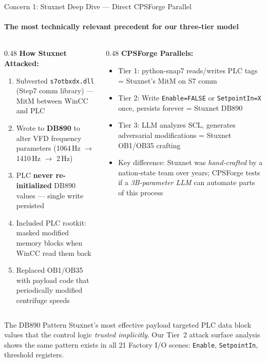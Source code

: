 \documentclass[aspectratio=169,10pt]{beamer}
\begin{document}
\begin{frame}{Concern 1: Stuxnet Deep Dive --- Direct CPSForge Parallel}
\framesubtitle{The most technically relevant precedent for our three-tier model}

\begin{columns}[T]
\begin{column}{0.48\textwidth}
\textbf{How Stuxnet Attacked:}
\begin{enumerate}\small
    \item Subverted \texttt{s7otbxdx.dll} (Step7 comm library) --- MitM between WinCC and PLC
    \item Wrote to \textbf{DB890} to alter VFD frequency parameters (1064\,Hz $\rightarrow$ 1410\,Hz $\rightarrow$ 2\,Hz)
    \item PLC \textbf{never re-initialized} DB890 values --- single write persisted
    \item Included PLC rootkit: masked modified memory blocks when WinCC read them back
    \item Replaced OB1/OB35 with payload code that periodically modified centrifuge speeds
\end{enumerate}
\end{column}

\begin{column}{0.48\textwidth}
\textbf{CPSForge Parallels:}
\begin{itemize}\small
    \item \textcolor{tier1}{Tier 1}: python-snap7 reads/writes PLC tags = Stuxnet's MitM on S7 comm
    \item \textcolor{tier2}{Tier 2}: Write \texttt{Enable=FALSE} or \texttt{SetpointIn=X} once, persists forever = Stuxnet DB890
    \item \textcolor{tier3}{Tier 3}: LLM analyzes SCL, generates adversarial modifications = Stuxnet OB1/OB35 crafting
    \item Key difference: Stuxnet was \emph{hand-crafted} by a nation-state team over years; CPSForge tests if a \emph{3B-parameter LLM} can automate parts of this process
\end{itemize}
\end{column}
\end{columns}

\vspace{0.3em}
\begin{alertblock}{The DB890 Pattern}
Stuxnet's most effective payload targeted PLC data block values that the control logic \emph{trusted implicitly}. Our Tier~2 attack surface analysis shows the same pattern exists in all 21 Factory I/O scenes: \texttt{Enable}, \texttt{SetpointIn}, threshold registers.
\end{alertblock}
\end{frame}
\end{document}
